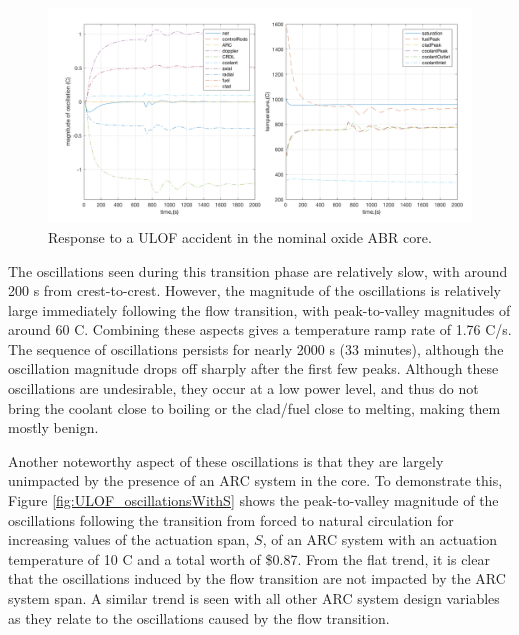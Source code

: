 \documentclass[11pt, oneside]{article}   	%
\begin{document}
\begin{figure}[h!]
\includegraphics[width=18cm]{nominalULOF}
\centering
\caption{Response to a ULOF accident in the nominal oxide ABR core.}
\label{fig:nominalULOF}
\end{figure}

The oscillations seen during this transition phase are relatively slow, with around 200 s from crest-to-crest. 
However, the magnitude of the oscillations is relatively large immediately following the flow transition, with peak-to-valley magnitudes of around 60 C.
Combining these aspects gives a temperature ramp rate of 1.76 C/s. 
The sequence of oscillations persists for nearly 2000 s (33 minutes), although the oscillation magnitude drops off sharply after the first few peaks. 
Although these oscillations are undesirable, they occur at a low power level, and thus do not bring the coolant close to boiling or the clad/fuel close to melting, making them mostly benign.

Another noteworthy aspect of these oscillations is that they are largely unimpacted by the presence of an ARC system in the core. 
To demonstrate this, Figure \ref{fig:ULOF_oscillationsWithS} shows the peak-to-valley magnitude of the oscillations following the transition from forced to natural circulation for increasing values of the actuation span, $S$, of an ARC system with an actuation temperature of 10 C and a total worth of \$0.87.
From the flat trend, it is clear that the oscillations induced by the flow transition are not impacted by the ARC system span.
A similar trend is seen with all other ARC system design variables as they relate to the oscillations caused by the flow transition.
\end{document}
